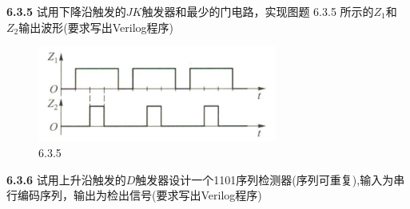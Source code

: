 \documentclass[a4paper,11pt,UTF8]{article}
\begin{document}
\textbf{6.3.5} 试用下降沿触发的$JK$触发器和最少的门电路，实现图题 6.3.5 所示的$Z_{1}$和$Z_{2}$输出波形(要求写出Verilog程序)
\begin{figure}[H]
	\centering
	\includegraphics[width=0.7\textwidth]{6.3.5}
	\caption{6.3.5}
\end{figure}
\textbf{6.3.6} 试用上升沿触发的$D$触发器设计一个1101序列检测器(序列可重复),输入为串行编码序列，输出为检出信号(要求写出Verilog程序)
\end{document}
